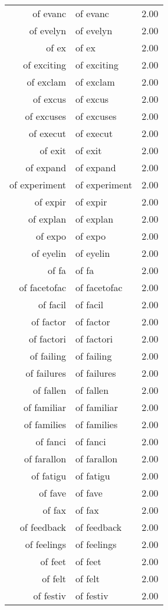 \begin{table}[ht]
\begin{tabular}{rlr}
  of evanc & of evanc & 2.00 \\ 
  of evelyn & of evelyn & 2.00 \\ 
  of ex & of ex & 2.00 \\ 
  of exciting & of exciting & 2.00 \\ 
  of exclam & of exclam & 2.00 \\ 
  of excus & of excus & 2.00 \\ 
  of excuses & of excuses & 2.00 \\ 
  of execut & of execut & 2.00 \\ 
  of exit & of exit & 2.00 \\ 
  of expand & of expand & 2.00 \\ 
  of experiment & of experiment & 2.00 \\ 
  of expir & of expir & 2.00 \\ 
  of explan & of explan & 2.00 \\ 
  of expo & of expo & 2.00 \\ 
  of eyelin & of eyelin & 2.00 \\ 
  of fa & of fa & 2.00 \\ 
  of facetofac & of facetofac & 2.00 \\ 
  of facil & of facil & 2.00 \\ 
  of factor & of factor & 2.00 \\ 
  of factori & of factori & 2.00 \\ 
  of failing & of failing & 2.00 \\ 
  of failures & of failures & 2.00 \\ 
  of fallen & of fallen & 2.00 \\ 
  of familiar & of familiar & 2.00 \\ 
  of families & of families & 2.00 \\ 
  of fanci & of fanci & 2.00 \\ 
  of farallon & of farallon & 2.00 \\ 
  of fatigu & of fatigu & 2.00 \\ 
  of fave & of fave & 2.00 \\ 
  of fax & of fax & 2.00 \\ 
  of feedback & of feedback & 2.00 \\ 
  of feelings & of feelings & 2.00 \\ 
  of feet & of feet & 2.00 \\ 
  of felt & of felt & 2.00 \\ 
  of festiv & of festiv & 2.00 \\ 

\end{tabular}
\end{table}
